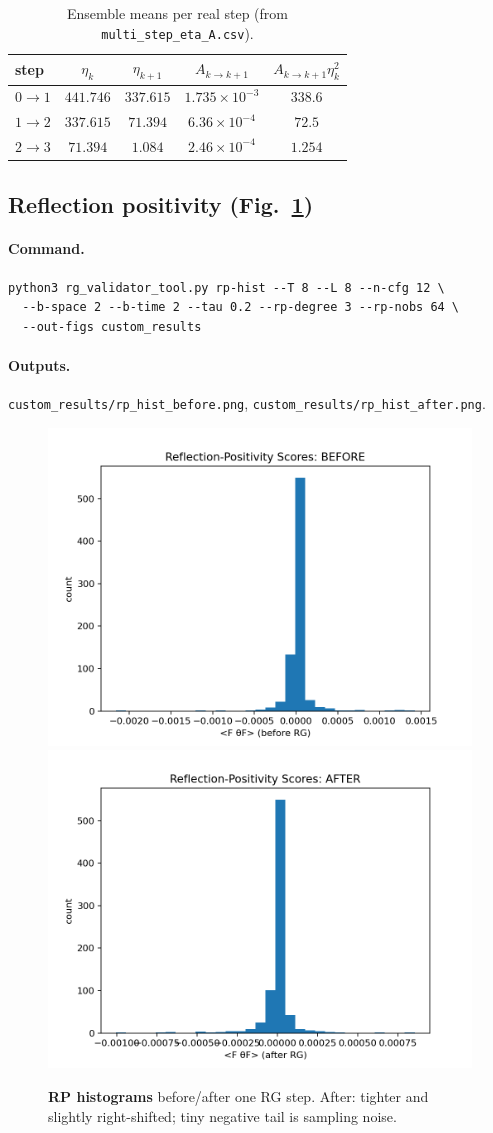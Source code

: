 \documentclass[11pt]{article}
\begin{document}
\begin{table}[t]
\centering
\small
\caption{Ensemble means per real step (from \texttt{multi\_step\_eta\_A.csv}).}
\label{tab:etasA}
\begin{tabular}{@{}lcccc@{}}
\toprule
step & $\eta_k$ & $\eta_{k+1}$ & $A_{k\to k+1}$ & $A_{k\to k+1}\eta_k^2$ \\ \midrule
$0\to1$ & $441.746$ & $337.615$ & $1.735\times10^{-3}$ & $338.6$ \\
$1\to2$ & $337.615$ & $71.394$  & $6.36\times10^{-4}$  & $72.5$  \\
$2\to3$ & $71.394$  & $1.084$   & $2.46\times10^{-4}$ & $1.254$ \\ \bottomrule
\end{tabular}
\end{table}

\subsection{Reflection positivity (Fig.~\ref{fig:rp})}

\paragraph{Command.}
\begin{Verbatim}[fontsize=\small]
python3 rg_validator_tool.py rp-hist --T 8 --L 8 --n-cfg 12 \
  --b-space 2 --b-time 2 --tau 0.2 --rp-degree 3 --rp-nobs 64 \
  --out-figs custom_results
\end{Verbatim}

\paragraph{Outputs.}
\texttt{custom\_results/rp\_hist\_before.png}, \texttt{custom\_results/rp\_hist\_after.png}.

\begin{figure}[t]
  \centering
  \includegraphics[width=.48\linewidth]{custom_results/rp_hist_before.png}\hfill
  \includegraphics[width=.48\linewidth]{custom_results/rp_hist_after.png}
  \caption{\textbf{RP histograms} before/after one RG step. After: tighter and slightly right-shifted; tiny negative tail is sampling noise.}
  \label{fig:rp}
\end{figure}
\end{document}
